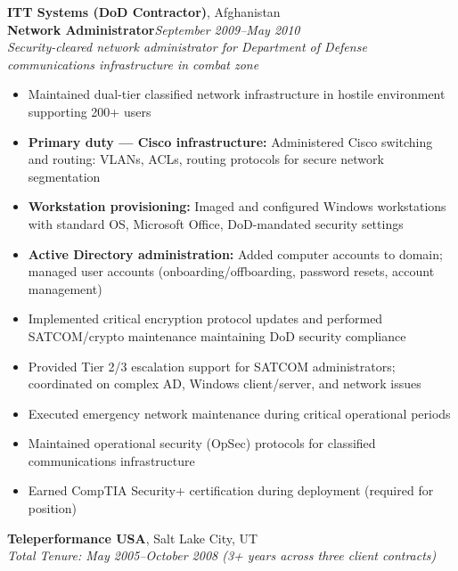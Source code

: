 \documentclass[9pt,letterpaper]{extarticle}
\begin{document}
\vspace{5pt}
\noindent\textbf{ITT Systems (DoD Contractor)}, Afghanistan\\
\textbf{Network Administrator}\hfill\textit{September 2009--May 2010}\\
\textit{Security-cleared network administrator for Department of Defense communications infrastructure in combat zone}
\begin{itemize}
  \item Maintained dual-tier classified network infrastructure in hostile environment supporting 200+ users
  \item \textbf{Primary duty --- Cisco infrastructure:} Administered Cisco switching and routing: VLANs, ACLs, routing protocols for secure network segmentation
  \item \textbf{Workstation provisioning:} Imaged and configured Windows workstations with standard OS, Microsoft Office, DoD-mandated security settings
  \item \textbf{Active Directory administration:} Added computer accounts to domain; managed user accounts (onboarding/offboarding, password resets, account management)
  \item Implemented critical encryption protocol updates and performed SATCOM/crypto maintenance maintaining DoD security compliance
  \item Provided Tier 2/3 escalation support for SATCOM administrators; coordinated on complex AD, Windows client/server, and network issues
  \item Executed emergency network maintenance during critical operational periods
  \item Maintained operational security (OpSec) protocols for classified communications infrastructure
  \item Earned CompTIA Security+ certification during deployment (required for position)
\end{itemize}

\vspace{5pt}
\noindent\textbf{Teleperformance USA}, Salt Lake City, UT\\
\textit{Total Tenure: May 2005--October 2008 (3+ years across three client contracts)}
\end{document}
